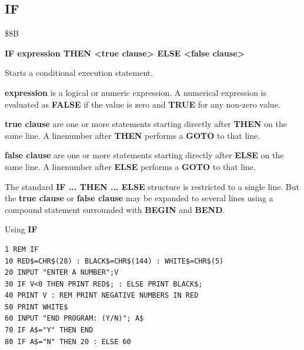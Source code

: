 \subsection{IF}
\begin{description}[leftmargin=2cm,style=nextline]
\item [Token:] \$8B
\item [Format:] {\bf IF expression THEN <true clause> ELSE <false clause>}
\item [Usage:] Starts a conditional execution
               statement.

               {\bf expression} is a logical or numeric expression.
               A numerical expression is evaluated as {\bf FALSE}
               if the value is zero and {\bf TRUE} for any non-zero
               value.

               {\bf true clause} are one or more statements starting
               directly after {\bf THEN} on the same line.
               A linenumber after {\bf THEN} performs a
               {\bf GOTO} to that line.

               {\bf false clause} are one or more statements starting
               directly after {\bf ELSE} on the same line.
               A linenumber after {\bf ELSE} performs a
               {\bf GOTO} to that line.

\item [Remarks:]
               The standard {\bf IF ... THEN ... ELSE} structure
               is restricted to a single line. But the {\bf true clause}
               or {\bf false clause} may be expanded to several lines
               using a compound statement surrounded with
               {\bf BEGIN} and {\bf BEND}.
\item [Example:]
                Using {\bf IF}
\begin{tcolorbox}[colback=black,coltext=white]
\verbatimfont{\codefont}
\begin{verbatim}
1 REM IF
10 RED$=CHR$(28) : BLACK$=CHR$(144) : WHITE$=CHR$(5)
20 INPUT "ENTER A NUMBER";V
30 IF V<0 THEN PRINT RED$; : ELSE PRINT BLACK$;
40 PRINT V : REM PRINT NEGATIVE NUMBERS IN RED
50 PRINT WHITE$
60 INPUT "END PROGRAM: (Y/N)"; A$
70 IF A$="Y" THEN END
80 IF A$="N" THEN 20 : ELSE 60
\end{verbatim}
\end{tcolorbox}
\end{description}


